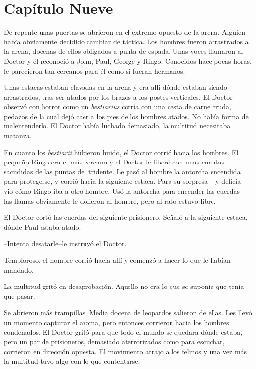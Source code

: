\chapter*{Capítulo Nueve}

De repente unas puertas se abrieron en el extremo opuesto de la arena.
Alguien había obviamente decidido cambiar de táctica. Los hombres fueron
arrastrados a la arena, docenas de ellos obligados a punta de espada.
Unas voces llamaron al Doctor y él reconoció a John, Paul, George y
Ringo. Conocidos hace pocas horas, le parecieron tan cercanos para él
como si fueran hermanos.

Unas estacas estaban clavadas en la arena y era allí dónde estaban
siendo arrastrados, tras ser atados por los brazos a los postes
verticales. El Doctor observó con horror como un \emph{bestiarius}
corría con una cesta de carne cruda, pedazos de la cual dejó caer a los
pies de los hombres atados. No había forma de malentenderlo. El Doctor
había luchado demasiado, la multitud necesitaba matanza.

En cuanto los \emph{bestiarii} hubieron huido, el Doctor corrió hacia
los hombres. El pequeño Ringo era el más cercano y el Doctor le liberó
con unas cuantas sacudidas de las puntas del tridente. Le pasó al hombre
la antorcha encendida para protegerse, y corrió hacia la siguiente
estaca. Para su sorpresa -- y delicia -- vio cómo Ringo iba a otro
hombre. Usó la antorcha para encender las cuerdas -- las llamas
obviamente le dolieron al hombre, pero al rato estuvo libre.

El Doctor cortó las cuerdas del siguiente prisionero. Señaló a la
siguiente estaca, dónde Paul estaba atado.

--Intenta desatarle--le instruyó el Doctor.

Tembloroso, el hombre corrió hacia allí y comenzó a hacer lo que le
habían mandado.

La multitud gritó en desaprobación. Aquello no era lo que se suponía que
tenía que pasar.

Se abrieron más trampillas. Media docena de leopardos salieron de ellas.
Les llevó un momento capturar el aroma, pero entonces corrieron hacia
los hombres condenados. El Doctor gritó para que todo el mundo se
quedara dónde estaba, pero un par de prisioneros, demasiado
aterrorizados como para escuchar, corrieron en dirección opuesta. El
movimiento atrajo a los felinos y una vez más la multitud tuvo algo con
lo que contentarse.

